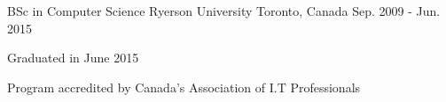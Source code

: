 \begin{cventries}
  \cventry
    {BSc in Computer Science}
    {Ryerson University}
    {Toronto, Canada}
    {Sep. 2009 - Jun. 2015}
    {
      \begin{cvitems}
        \item {Graduated in June 2015}
        \item {Program accredited by Canada's Association of I.T Professionals}
      \end{cvitems}
    }
\end{cventries}

